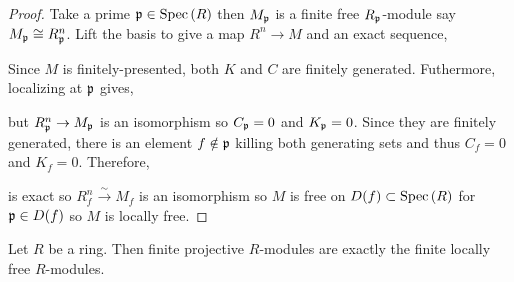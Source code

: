 \documentclass[12pt]{article}
\begin{document}
\begin{proof}
Take a prime $\mathfrak{p} \in \mathrm{Spec}\left( R \right)$ then $M_{\mathfrak{p}}$ is a finite free $R_{\mathfrak{p}}$-module say $M_{\mathfrak{p}} \cong R_{\mathfrak{p}}^n$. Lift the basis to give a map $R^n \to M$ and an exact sequence,
\begin{center}
\end{center}
Since $M$ is finitely-presented, both $K$ and $C$ are finitely generated. Futhermore, localizing at $\mathfrak{p}$ gives,
\begin{center}
\end{center}
but $R^n_{\mathfrak{p}} \to M_{\mathfrak{p}}$ is an isomorphism so $C_{\mathfrak{p}} = 0$ and $K_{\mathfrak{p}} = 0$. Since they are finitely generated, there is an element $f \notin \mathfrak{p}$ killing both generating sets and thus $C_f = 0$ and $K_f = 0$. Therefore, 
\begin{center}
\end{center}
is exact so $R^n_f \xrightarrow{\sim} M_f$ is an isomorphism so $M$ is free on $D(f) \subset \mathrm{Spec}\left( R \right)$ for $\mathfrak{p} \in D(f)$ so $M$ is locally free.
\end{proof}

\begin{theorem}
Let $R$ be a ring. Then finite projective $R$-modules are exactly the finite locally free $R$-modules. 
\end{theorem}
\end{document}
